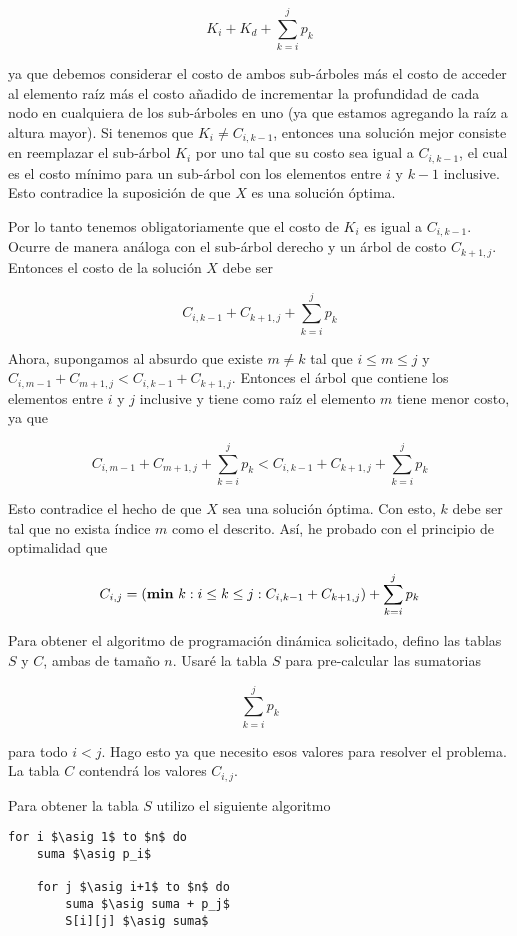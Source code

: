 \documentclass{article}
\newcommand{\asig}{\ensuremath{\leftarrow}}
\begin{document}
$$
K_i + K_d + \sum_{k=i}^j p_k
$$

ya que debemos considerar el costo de ambos sub-árboles más el costo de acceder al
elemento raíz más el costo añadido de incrementar la profundidad de cada nodo en
cualquiera de los sub-árboles en uno (ya que estamos agregando la raíz a altura mayor).
Si tenemos que $K_i \neq C_{i,k-1}$, entonces una solución mejor consiste en reemplazar
el sub-árbol $K_i$ por uno tal que su costo sea igual a $C_{i,k-1}$, el cual es el costo
mínimo para un sub-árbol con los elementos entre $i$ y $k-1$ inclusive. Esto contradice
la suposición de que $X$ es una solución óptima.

Por lo tanto tenemos obligatoriamente que el costo de $K_i$ es igual a $C_{i,k-1}$.
Ocurre de manera análoga con el sub-árbol derecho y un árbol de costo $C_{k+1,j}$.
Entonces el costo de la solución $X$ debe ser 

$$
C_{i,k-1} + C_{k+1,j} + \sum_{k=i}^j p_k
$$

Ahora, supongamos al absurdo que existe $m \neq k$ tal que $i \leq m \leq j$ y
$C_{i,m-1}+C_{m+1,j} < C_{i,k-1}+C_{k+1,j}$. Entonces el árbol que contiene los
elementos entre $i$ y $j$ inclusive y tiene como raíz el elemento $m$ tiene menor
costo, ya que 

$$
C_{i,m-1} + C_{m+1,j} + \sum_{k=i}^j p_k < C_{i,k-1} + C_{k+1,j} + \sum_{k=i}^j p_k
$$

Esto contradice el hecho de que $X$ sea una solución óptima. Con esto, $k$ debe ser tal que
no exista índice $m$ como el descrito. Así, he probado con el principio de optimalidad
que

$$
C_{i,j} = (\text{{\bf min} } k : i \leq k \leq j : C_{i,k-1} + C_{k+1,j}) + \sum_{k=i}^j p_k
$$

Para obtener el algoritmo de programación dinámica solicitado,
defino las tablas $S$ y $C$, ambas de tamaño $n$. Usaré la tabla $S$ para pre-calcular las sumatorias

$$
\sum_{k=i}^j p_k
$$

para todo $i < j$. Hago esto ya que necesito esos valores para resolver el problema. La tabla $C$ contendrá
los valores $C_{i,j}$.

Para obtener la tabla $S$ utilizo el siguiente algoritmo

\begin{lstlisting}[caption={Cálculo de la tabla S},label=alg:tablaS]
for i $\asig 1$ to $n$ do
    suma $\asig p_i$

    for j $\asig i+1$ to $n$ do
        suma $\asig suma + p_j$
        S[i][j] $\asig suma$
\end{lstlisting}
\end{document}
